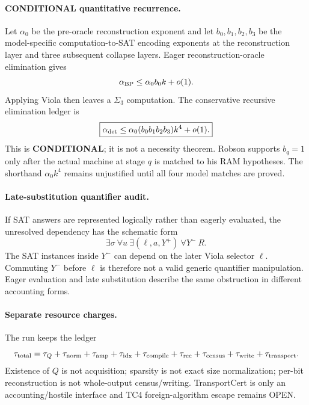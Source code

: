 \documentclass[11pt]{article}
\begin{document}
\paragraph{CONDITIONAL quantitative recurrence.}
Let $\alpha_0$ be the pre-oracle reconstruction exponent and let $b_0,b_1,b_2,b_3$ be the model-specific computation-to-SAT encoding exponents at the reconstruction layer and three subsequent collapse layers. Eager reconstruction-oracle elimination gives
\[
\alpha_{\rm BP}\le \alpha_0 b_0 k+o(1).
\]
Applying Viola then leaves a $\Sigma_3$ computation. The conservative recursive elimination ledger is
\[
\boxed{\alpha_{\rm det}\le \alpha_0(b_0b_1b_2b_3)k^4+o(1).}
\]
This is \textbf{CONDITIONAL}; it is not a necessity theorem. Robson supports $b_q=1$ only after the actual machine at stage $q$ is matched to his RAM hypotheses. The shorthand $\alpha_0k^4$ remains unjustified until all four model matches are proved.

\paragraph{Late-substitution quantifier audit.}
If SAT answers are represented logically rather than eagerly evaluated, the unresolved dependency has the schematic form
\[
\boxed{\exists\sigma\ \forall u\ \exists(\ell,a,Y^+)\ \forall Y^-\ R.}
\]
The SAT instances inside $Y^-$ can depend on the later Viola selector $\ell$. Commuting $Y^-$ before $\ell$ is therefore not a valid generic quantifier manipulation. Eager evaluation and late substitution describe the same obstruction in different accounting forms.

\paragraph{Separate resource charges.}
The run keeps the ledger
\[
\tau_{\rm total}=\tau_Q+\tau_{\rm norm}+\tau_{\rm amp}+\tau_{\rm idx}+\tau_{\rm compile}+\tau_{\rm rec}+\tau_{\rm census}+\tau_{\rm write}+\tau_{\rm transport}.
\]
Existence of $Q$ is not acquisition; sparsity is not exact size normalization; per-bit reconstruction is not whole-output census/writing. TransportCert is only an accounting/hostile interface and TC4 foreign-algorithm escape remains OPEN.
\end{document}
